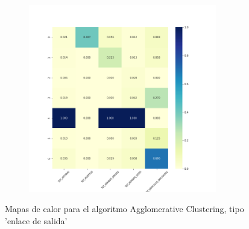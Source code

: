 \begin{figure}[H]
\begin{subfigure}{.5\textwidth}
\end{subfigure}
\begin{subfigure}{.5\textwidth}
  \centering
  \includegraphics[width=0.9\textwidth]{imagenes/case1/agglomerative/heatmaps/hm_agglomerative_case1_salida_k7.png}
\end{subfigure}
\caption{Mapas de calor para el algoritmo Agglomerative Clustering, tipo 'enlace de salida'}
\label{fig:hm-km}
\end{figure}

